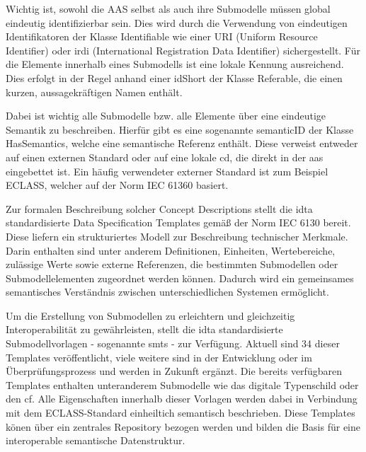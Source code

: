 Wichtig ist, sowohl die AAS selbst als auch ihre Submodelle müssen global eindeutig identifizierbar sein.
Dies wird durch die Verwendung von eindeutigen Identifikatoren der Klasse Identifiable wie einer URI (Uniform Resource Identifier) oder \acs{irdi} (International Registration Data Identifier) sichergestellt.
Für die Elemente innerhalb eines Submodells ist eine lokale Kennung ausreichend. Dies erfolgt in der Regel anhand einer idShort der Klasse Referable, die einen kurzen, aussagekräftigen Namen enthält.

Dabei ist wichtig alle Submodelle bzw. alle Elemente über eine eindeutige Semantik zu beschreiben.
Hierfür gibt es eine sogenannte semanticID der Klasse HasSemantics, welche eine semantische Referenz enthält.
Diese verweist entweder auf einen externen Standard oder auf eine lokale \ac{cd}, die direkt in der \acs{aas} eingebettet ist.
Ein häufig verwendeter externer Standard ist zum Beispiel ECLASS, welcher auf der Norm IEC 61360 \cite{ECLASSIEC61360} basiert.

Zur formalen Beschreibung solcher Concept Descriptions stellt die \acs{idta} standardisierte Data Specification Templates gemäß der Norm IEC 6130 \cite{SpezifikationPart3a} bereit.
Diese liefern ein strukturiertes Modell zur Beschreibung technischer Merkmale.
Darin enthalten sind unter anderem Definitionen, Einheiten, Wertebereiche, zulässige Werte sowie externe Referenzen, die bestimmten Submodellen oder Submodellelementen zugeordnet werden können.
Dadurch wird ein gemeinsames semantisches Verständnis zwischen unterschiedlichen Systemen ermöglicht.


Um die Erstellung von Submodellen zu erleichtern und gleichzeitig Interoperabilität zu gewährleisten, stellt die \acs{idta} standardisierte Submodellvorlagen - sogenannte \acp{smt} - zur Verfügung.
Aktuell sind 34 dieser Templates veröffentlicht, viele weitere sind in der Entwicklung oder im Überprüfungsprozess und werden in Zukunft ergänzt.
Die bereits verfügbaren Templates enthalten unteranderem Submodelle wie das digitale Typenschild oder den \ac{cf}.
Alle Eigenschaften innerhalb dieser Vorlagen werden dabei in Verbindung mit dem ECLASS-Standard einheiltich semantisch beschrieben.
Diese Templates könen über ein zentrales Repository \cite{idtaTemplates} bezogen werden und bilden die Basis für eine interoperable semantische Datenstruktur.

